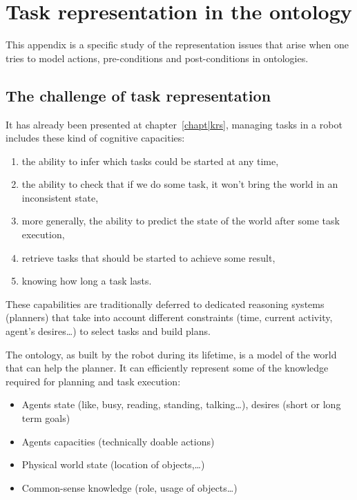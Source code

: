 \chapter{Task representation in the ontology}
\label{appendix|tasks}

This appendix is a specific study of the representation issues that arise when
one tries to model actions, pre-conditions and post-conditions in ontologies.

\section{The challenge of task representation}

It has already been presented at chapter~\ref{chapt|krs}, managing tasks in a
robot includes these kind of cognitive capacities:


\begin{enumerate}

    \item  the ability to infer which tasks could be started at any time,

    \item  the ability to check that if we do some task, it won't bring the
    world in an inconsistent state,

    \item  more generally, the ability to predict the state of the world after
    some task execution,

    \item  retrieve tasks that should be started to achieve some result,

    \item  knowing how long a task lasts.

\end{enumerate}

These capabilities are traditionally deferred to dedicated reasoning systems
(planners) that take into account different constraints (time, current
activity, agent's desires\ldots{}) to select tasks and build plans.

The ontology, as built by the robot during its lifetime, is a model of the
world that can help the planner. It can efficiently represent some of the
knowledge required for planning and task execution:


\begin{itemize}

\item  Agents state (like, busy, reading, standing, talking\ldots{}), desires
(short or long term goals)

\item  Agents capacities (technically doable actions)

\item  Physical world state (location of objects,\ldots{})

\item  Common-sense knowledge (role, usage of objects\ldots{})

\end{itemize}

